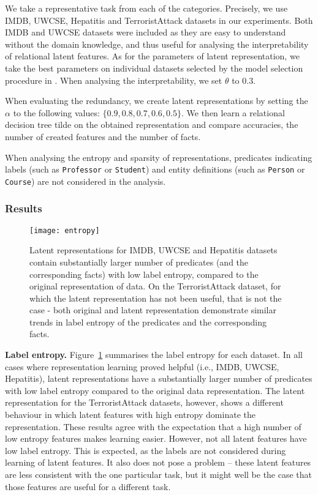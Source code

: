 We take a representative task from each of the categories.
Precisely, we use IMDB, UWCSE, Hepatitis and TerroristAttack datasets in our experiments.
Both IMDB and UWCSE datasets were included as they are easy to understand without the domain knowledge, and thus useful for analysing the interpretability of relational latent features.
As for the parameters of latent representation, we take the best parameters on individual datasets selected by the model selection procedure in \cite{Dumancic2017}.
When analysing the interpretability, we set $\theta$ to $0.3$.

When evaluating the redundancy, we create latent representations by setting the $\alpha$ to the following values: $\{0.9, 0.8, 0.7, 0.6, 0.5\}$.
We then learn a relational decision tree \gls{tilde} on the obtained representation and compare accuracies, the number of created features and the number of facts.


When analysing the entropy and sparsity of representations, predicates indicating labels (such as \texttt{Professor} or \texttt{Student}) and entity definitions (such as \texttt{Person} or \texttt{Course}) are not considered in the analysis.


\subsubsection{Results}


\begin{figure}[t]
	\centering
	\medskip
    \texttt{[image: entropy]}
    \caption[Label entropy of latent representation created by \gls{curled}]{Latent representations for IMDB, UWCSE and Hepatitis datasets contain substantially larger number of predicates (and the corresponding facts) with low label entropy, compared to the original representation of data. On the TerroristAttack dataset, for which the latent representation has not been useful, that is not the case - both original and latent representation demonstrate similar trends in label entropy of the predicates and the corresponding facts.}
    \label{fig:Entropy}
\end{figure}


\textbf{Label entropy.}
Figure~\ref{fig:Entropy} summarises the label entropy for each dataset.
In all cases where representation learning proved helpful (i.e., IMDB, UWCSE, Hepatitis), latent representations have a substantially larger number of predicates with low label entropy compared to the original data representation.
The latent representation for the TerroristAttack datasets, however, shows a different behaviour in which latent features with high entropy dominate the representation.
These results agree with the expectation that a high number of low entropy features makes learning easier.
However, not all latent features have low label entropy.
This is expected, as the labels are not considered during learning of latent features.
It also does not pose a problem -- these latent features are less consistent with the one particular task, but it might well be the case that those features are useful for a different task.




